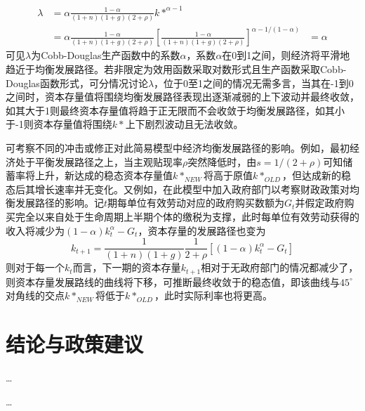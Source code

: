 \documentclass[supercite]{HustGraduPaper}
\begin{document}
    \begin{equation}
    \begin{aligned}
    \lambda &=\alpha\frac{1-\alpha}{(1+n)(1+g)(2+\rho)}k*^{\alpha-1}\\
    &=\alpha\frac{1-\alpha}{(1+n)(1+g)(2+\rho)}[\frac{1-\alpha}{(1+n)(1+g)(2+\rho)}]^{\alpha-1/(1-\alpha)}
    &=\alpha
    \end{aligned}
    \end{equation}
    可见$\lambda$为Cobb-Douglas生产函数中的系数$\alpha$，系数$\alpha$在0到1之间，则经济将平滑地趋近于均衡发展路径。若非限定为效用函数采取对数形式且生产函数采取Cobb-Douglas函数形式，可分情况讨论$\lambda$，位于0至1之间的情况无需多言，当其在-1到0之间时，资本存量值将围绕均衡发展路径表现出逐渐减弱的上下波动并最终收敛，如其大于1则最终资本存量值将趋于正无限而不会收敛于均衡发展路径，如其小于-1则资本存量值将围绕$k*$上下剧烈波动且无法收敛。    
    
    可考察不同的冲击或修正对此简易模型中经济均衡发展路径的影响。例如，最初经济处于平衡发展路径之上，当主观贴现率$\rho$突然降低时，由$s=1/(2+\rho)$可知储蓄率将上升，新达成的稳态资本存量值$k*_{NEW}$将高于原值$k*_{OLD}$，但达成新的稳态后其增长速率并无变化。又例如，在此模型中加入政府部门以考察财政政策对均衡发展路径的影响。记$t$期每单位有效劳动对应的政府购买数额为$G_t$并假定政府购买完全以来自处于生命周期上半期个体的缴税为支撑，此时每单位有效劳动获得的收入将减少为$(1-\alpha)k_t^\alpha-G_t$，资本存量的发展路径也变为
    \begin{equation}
    k_{t+1}=\frac{1}{(1+n)(1+g)}\frac{1}{2+\rho}[(1-\alpha)k_{t}^\alpha-G_t]
    \end{equation}
    则对于每一个$k_t$而言，下一期的资本存量$k_{t+1}$相对于无政府部门的情况都减少了，则资本存量发展路线的曲线将下移，可推断最终收敛于的稳态值，即该曲线与$45^{\circ}$对角线的交点$k*_{NEW}$将低于$k*_{OLD}$，此时实际利率也将更高。

    
    \section{结论与政策建议}
    \ldots
    
    
    
    \begin{thankpage}
    \ldots
    \end{thankpage}

    
    
\end{document}
